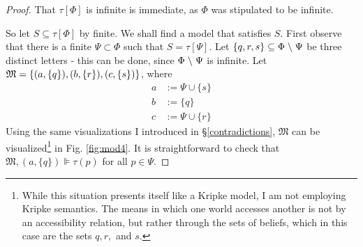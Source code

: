 \begin{proof}
That $\tau[\Phi]$ is infinite is immediate, as $\Phi$ was stipulated to be infinite. 

So let $S\subseteq \tau[\Phi]$ by finite.  We shall find a model that
satisfies $S$.  First observe that there is a
 finite $\Psi\subset
\Phi$ such that $S = \tau[\Psi]$.  Let $\{q,r,s\} \subseteq \Phi \; \backslash
\; \Psi$ be
 three distinct letters - this can be done, since $\Phi \;
\backslash \; \Psi$ is infinite.
  Let $\mathfrak{M} = \{( a, \{q\} ),
( b, \{r\} ), ( c, \{s\} ) \}$, where 
\begin{align*}
a & := \Psi \cup \{s\} \\
b & := \{q \} \\
c & := \Psi \cup \{r\}
\end{align*}
 Using the same visualizations I introduced in \S\ref{contradictions},
 $\mathfrak{M}$ can  be visualized\footnote{While this situation
   presents itself like a Kripke model, I am not employing Kripke
   semantics.  The means in which one world accesses another is not by
   an accessibility relation, but rather through the sets of beliefs,
   which in this case are the sets ${q},{r},$ and ${s}$.} in Fig. \ref{fig:mod4}.  It is straightforward to 
check that $\mathfrak{M},( a,\{q\}) \VDash \tau(p)$ for all $p \in \Psi$.


\end{proof}

